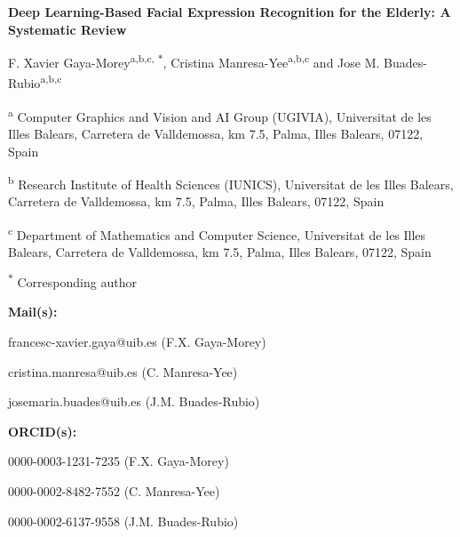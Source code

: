 {\LARGE\textbf{Deep Learning-Based Facial Expression Recognition for the Elderly: A Systematic Review}}

\medskip

{\large F. Xavier Gaya-Morey\textsuperscript{a,b,c, $\ast$}, Cristina Manresa-Yee\textsuperscript{a,b,c} and Jose M. Buades-Rubio\textsuperscript{a,b,c}}

\bigskip

\textsuperscript{a} Computer Graphics and Vision and AI Group (UGIVIA), Universitat de les Illes Balears, Carretera de Valldemossa, km 7.5, Palma, Illes Balears, 07122, Spain

\textsuperscript{b} Research Institute of Health Sciences (IUNICS), Universitat de les Illes Balears, Carretera de Valldemossa, km 7.5, Palma, Illes Balears, 07122, Spain

\textsuperscript{c} Department of Mathematics and Computer Science, Universitat de les Illes Balears, Carretera de Valldemossa, km 7.5, Palma, Illes Balears, 07122, Spain

\textsuperscript{$\ast$} Corresponding author

\bigskip

\textbf{Mail(s):} 

francesc-xavier.gaya@uib.es (F.X. Gaya-Morey)

cristina.manresa@uib.es (C. Manresa-Yee)

josemaria.buades@uib.es (J.M. Buades-Rubio)

\bigskip

\textbf{ORCID(s):} 

0000-0003-1231-7235 (F.X. Gaya-Morey)

0000-0002-8482-7552 (C. Manresa-Yee)

0000-0002-6137-9558 (J.M. Buades-Rubio)
